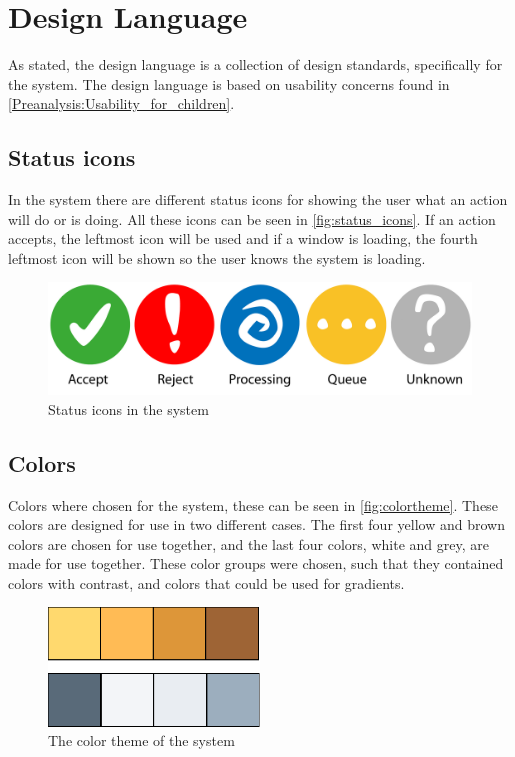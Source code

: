 \section{Design Language}
\label{design:design_language}
As stated, the design language is a collection of design standards, specifically for the \giraf[] system. 
The design language is based on usability concerns found in \autoref{Preanalysis:Usability_for_children}.

\subsection{Status icons}
\label{design:state_icons}

In the \giraf[] system there are different status icons for showing the user what an action will do or is doing. All these icons can be seen in \autoref{fig:status_icons}. If an action accepts, the leftmost icon will be used and if a window is loading, the fourth leftmost icon will be shown so the user knows the system is loading.

\begin{figure}[h!]
	\centering
	\includegraphics[width=\textwidth]{gfx/status_icons}
	\caption{Status icons in the \giraf[] system}
	\label{fig:status_icons}
\end{figure}

\subsection{Colors}
\label{design:giraf_colors}

Colors where chosen for the \giraf[] system, these can be seen in \autoref{fig:colortheme}. These colors are designed for use in two different cases. The first four yellow and brown colors are chosen for use together, and the last four colors, white and grey, are made for use together. 
These color groups were chosen, such that they contained colors with contrast, and colors that could be used for gradients.

\begin{figure}[h!]
	\centering
	\includegraphics[width=0.5\textwidth]{gfx/design_color_theme}
	\caption{The color theme of the \giraf[] system}
	\label{fig:colortheme}
\end{figure}

